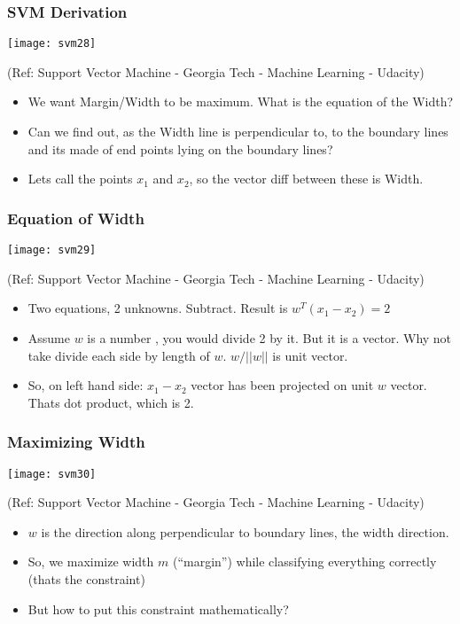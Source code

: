 \begin{frame}[fragile] \frametitle{SVM Derivation}
\begin{center}
\texttt{[image: svm28]}

\tiny{(Ref: Support Vector Machine - Georgia Tech - Machine Learning - Udacity)}
\end{center}

\begin{itemize}
\item We want Margin/Width to be maximum. What is the equation of the Width?
\item Can we find out, as the Width line is perpendicular to, to the boundary lines and its made of end points lying on the boundary lines?
\item Lets call the points $x_1$ and $x_2$, so the vector diff between these is Width.
\end{itemize}
\end{frame}

\begin{frame}[fragile] \frametitle{Equation of Width}
\begin{center}
\texttt{[image: svm29]}

\tiny{(Ref: Support Vector Machine - Georgia Tech - Machine Learning - Udacity)}
\end{center}

\begin{itemize}
\item Two equations, 2 unknowns. Subtract. Result is $w^T(x_1 - x_2) = 2$
\item Assume $w$ is a number , you would divide 2 by it. But it is a vector. Why not take divide each side by length of $w$. $w/||w||$ is unit vector.
\item So, on left hand side: $x_1 - x_2$ vector has been projected on unit $w$ vector. Thats dot product, which is 2.
\end{itemize}
\end{frame}

\begin{frame}[fragile] \frametitle{Maximizing Width}
\begin{center}
\texttt{[image: svm30]}

\tiny{(Ref: Support Vector Machine - Georgia Tech - Machine Learning - Udacity)}
\end{center}

\begin{itemize}
\item $w$ is the direction along perpendicular to boundary lines, the width direction.
\item So, we maximize width $m$ (``margin'') while classifying everything correctly (thats the constraint)
\item But how to put this constraint mathematically?
\end{itemize}
\end{frame}

